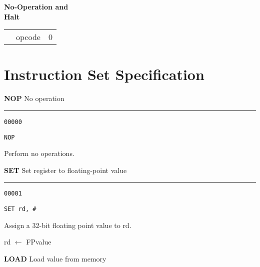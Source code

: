 \documentclass{article}
\begin{document}
\bigskip\bigskip\bigskip

\begin{minipage}[t]{0.3\textwidth}
	\begin{center}
		\textbf{No-Operation and \\ Halt}
	\end{center}
\end{minipage}
\begin{minipage}[t]{110mm}
	\begin{tabular}{p{12mm}|C{15mm}|C{75.3mm}|}
		 & opcode &  0 \\
	\end{tabular}
\end{minipage}

\pagebreak

\section{Instruction Set Specification}

\bigskip\bigskip

\flushleft
\LARGE\textbf{NOP} \large \hfill No operation

\kern-3pt
\noindent\rule{16.5cm}{0.4pt}
\normalsize

{\large
	 \texttt{00000} \par
	\smallbreak
	 \texttt{NOP} \par
	\smallbreak
	 Perform no operations. \par
}

\bigskip\bigskip

\flushleft
\LARGE\textbf{SET} \large \hfill Set register to floating-point value

\kern-3pt
\noindent\rule{16.5cm}{0.4pt}
\normalsize

{\large
	 \texttt{00001} \par
	\smallbreak
	 \texttt{SET rd, \#<32-bit FP value>} \par
	\smallbreak
	 Assign a 32-bit floating point value to rd. \par
	\smallbreak
	 rd $\leftarrow$ FPvalue \par
}

\bigskip\bigskip

\flushleft
\LARGE\textbf{LOAD} \large \hfill Load value from memory
\end{document}
